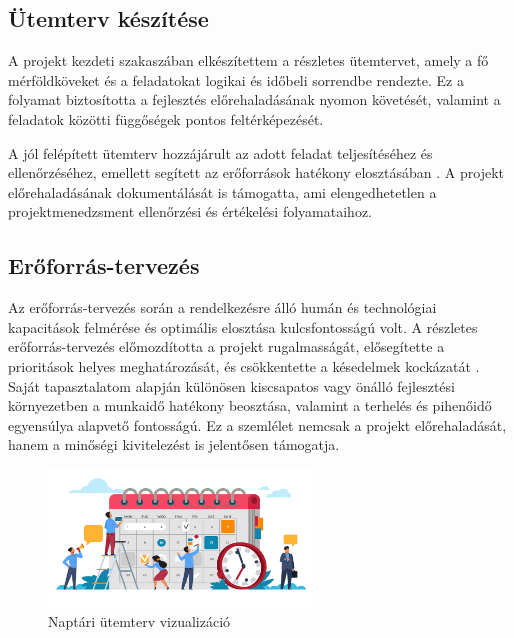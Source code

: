 \subsection{Ütemterv készítése}

A projekt kezdeti szakaszában elkészítettem a részletes ütemtervet, amely a fő mérföldköveket és a feladatokat logikai és időbeli sorrendbe rendezte.  
Ez a folyamat biztosította a fejlesztés előrehaladásának nyomon követését, valamint a feladatok közötti függőségek pontos feltérképezését.  

A jól felépített ütemterv hozzájárult az adott feladat teljesítéséhez és ellenőrzéséhez, emellett segített az erőforrások hatékony elosztásában \cite{Kovacs2016,Kaposi2019}.  
A projekt előrehaladásának dokumentálását is támogatta,  
ami elengedhetetlen a projektmenedzsment ellenőrzési és értékelési folyamataihoz.

\subsection{Erőforrás-tervezés}

Az erőforrás-tervezés során a rendelkezésre álló humán és technológiai kapacitások felmérése és optimális elosztása kulcsfontosságú volt.  
A részletes erőforrás-tervezés előmozdította a projekt rugalmasságát, elősegítette a prioritások helyes meghatározását, és csökkentette a késedelmek kockázatát \cite{Hajdu2014,Szalay2018}.  
Saját tapasztalatom alapján különösen kiscsapatos vagy önálló fejlesztési környezetben a munkaidő hatékony beosztása, valamint a terhelés és pihenőidő egyensúlya alapvető fontosságú.  
Ez a szemlélet nemcsak a projekt előrehaladását, hanem a minőségi kivitelezést is jelentősen támogatja.

\begin{figure}[H]
    \centering
    \includegraphics[width=70mm, keepaspectratio]{figures/plan.png}
    \caption{Naptári ütemterv vizualizáció}
    \label{fig:plan}
\end{figure}

